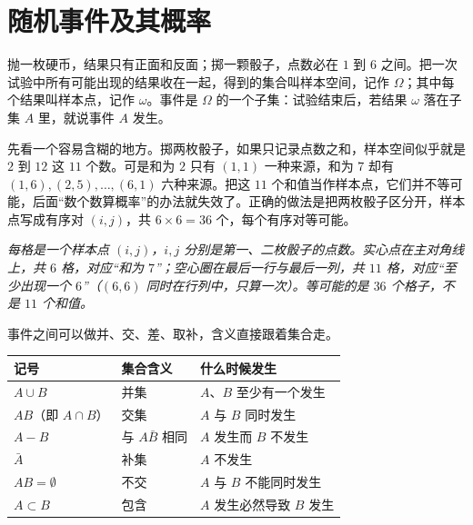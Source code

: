 \section{随机事件及其概率}

抛一枚硬币，结果只有正面和反面；掷一颗骰子，点数必在 $1$ 到 $6$ 之间。把一次试验中所有可能出现的结果收在一起，得到的集合叫样本空间，记作 $\Omega$；其中每个结果叫样本点，记作 $\omega$。事件是 $\Omega$ 的一个子集：试验结束后，若结果 $\omega$ 落在子集 $A$ 里，就说事件 $A$ 发生。

先看一个容易含糊的地方。掷两枚骰子，如果只记录点数之和，样本空间似乎就是 $2$ 到 $12$ 这 $11$ 个数。可是和为 $2$ 只有 $(1,1)$ 一种来源，和为 $7$ 却有 $(1,6),(2,5),\dots,(6,1)$ 六种来源。把这 $11$ 个和值当作样本点，它们并不等可能，后面“数个数算概率”的办法就失效了。正确的做法是把两枚骰子区分开，样本点写成有序对 $(i,j)$，共 $6\times6=36$ 个，每个有序对等可能。

\begin{center}
\par\vspace{2pt}
{\footnotesize\itshape 每格是一个样本点 $(i,j)$，$i,j$ 分别是第一、二枚骰子的点数。实心点在主对角线上，共 $6$ 格，对应“和为 $7$”；空心圈在最后一行与最后一列，共 $11$ 格，对应“至少出现一个 $6$”（$(6,6)$ 同时在行列中，只算一次）。等可能的是 $36$ 个格子，不是 $11$ 个和值。}
\end{center}

事件之间可以做并、交、差、取补，含义直接跟着集合走。

\begin{center}
\begin{tabular}{lll}
\toprule
记号 & 集合含义 & 什么时候发生 \\
\midrule
$A\cup B$ & 并集 & $A$、$B$ 至少有一个发生 \\
$AB$（即 $A\cap B$） & 交集 & $A$ 与 $B$ 同时发生 \\
$A-B$ & 与 $A\bar B$ 相同 & $A$ 发生而 $B$ 不发生 \\
$\bar A$ & 补集 & $A$ 不发生 \\
$AB=\emptyset$ & 不交 & $A$ 与 $B$ 不能同时发生 \\
$A\subset B$ & 包含 & $A$ 发生必然导致 $B$ 发生 \\
\bottomrule
\end{tabular}
\end{center}

